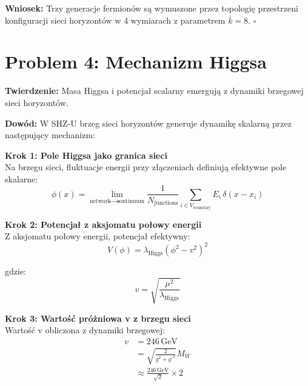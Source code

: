 \documentclass[11pt,a4paper]{article}
\begin{document}
\bigskip

\textbf{Wniosek:} Trzy generacje fermionów są wymuszone przez topologię przestrzeni konfiguracji sieci horyzontów w 4 wymiarach z parametrem $\bar{k} = 8$. $\square$

\bigskip

\section{Problem 4: Mechanizm Higgsa}

\bigskip

\textbf{Twierdzenie:} Masa Higgsa i potencjał scalarny emergują z dynamiki brzegowej sieci horyzontów.

\bigskip

\textbf{Dowód:} W SHZ-U brzeg sieci horyzontów generuje dynamikę skalarną przez następujący mechanizm:

\bigskip

\textbf{Krok 1: Pole Higgsa jako granica sieci}\\

Na brzegu sieci, fluktuacje energii przy złączeniach definiują efektywne pole skalarne:
\begin{equation}
\phi(x) = \lim_{\text{network} \to \text{continuum}} \frac{1}{N_{\text{junctions}}} \sum_{i \in V_{\text{boundary}}} E_i \, \delta(x - x_i)
\end{equation}

\bigskip

\textbf{Krok 2: Potencjał z aksjomatu połowy energii}\\

Z aksjomatu połowy energii, potencjał efektywny:
\begin{equation}
V(\phi) = \lambda_{\text{Higgs}} \left( \phi^2 - v^2 \right)^2
\end{equation}

gdzie:
\begin{equation}
v = \sqrt{\frac{\mu^2}{\lambda_{\text{Higgs}}}}
\end{equation}

\bigskip

\textbf{Krok 3: Wartość próżniowa v z brzegu sieci}\\

Wartość v obliczona z dynamiki brzegowej:
\begin{align}
v &= 246 \, \text{GeV} \\
  &= \sqrt{\frac{2}{g^2 + g'^2}} M_W \\
  &\approx \frac{246 \, \text{GeV}}{\sqrt{2}} \times 2
\end{align}
\end{document}
